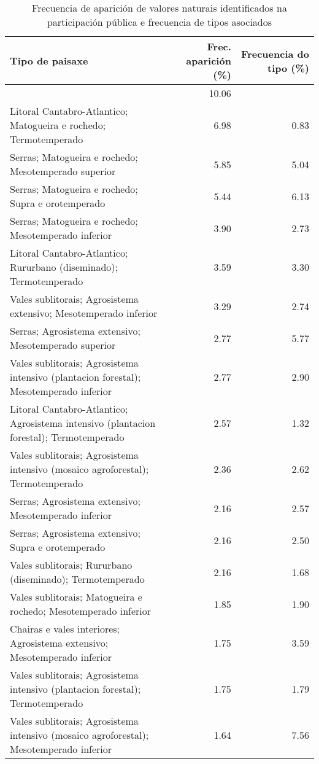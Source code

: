 \begin{table}[p]
\centering
\caption{Frecuencia de aparición de valores naturais identificados na participación pública e frecuencia de tipos asociados} 
\label{vsixotnat}
\begin{tabular}{lrr}
  \hline
Tipo de paisaxe & Frec. aparición (\%) & Frecuencia do tipo (\%) \\ 
  \hline
 & 10.06 &  \\ 
  Litoral Cantabro-Atlantico; Matogueira e rochedo; Termotemperado & 6.98 & 0.83 \\ 
  Serras; Matogueira e rochedo; Mesotemperado superior & 5.85 & 5.04 \\ 
  Serras; Matogueira e rochedo; Supra e orotemperado & 5.44 & 6.13 \\ 
  Serras; Matogueira e rochedo; Mesotemperado inferior & 3.90 & 2.73 \\ 
  Litoral Cantabro-Atlantico; Rururbano (diseminado); Termotemperado & 3.59 & 3.30 \\ 
  Vales sublitorais; Agrosistema extensivo; Mesotemperado inferior & 3.29 & 2.74 \\ 
  Serras; Agrosistema extensivo; Mesotemperado superior & 2.77 & 5.77 \\ 
  Vales sublitorais; Agrosistema intensivo (plantacion forestal); Mesotemperado inferior & 2.77 & 2.90 \\ 
  Litoral Cantabro-Atlantico; Agrosistema intensivo (plantacion forestal); Termotemperado & 2.57 & 1.32 \\ 
  Vales sublitorais; Agrosistema intensivo (mosaico agroforestal); Termotemperado & 2.36 & 2.62 \\ 
  Serras; Agrosistema extensivo; Mesotemperado inferior & 2.16 & 2.57 \\ 
  Serras; Agrosistema extensivo; Supra e orotemperado & 2.16 & 2.50 \\ 
  Vales sublitorais; Rururbano (diseminado); Termotemperado & 2.16 & 1.68 \\ 
  Vales sublitorais; Matogueira e rochedo; Mesotemperado inferior & 1.85 & 1.90 \\ 
  Chairas e vales interiores; Agrosistema extensivo; Mesotemperado inferior & 1.75 & 3.59 \\ 
  Vales sublitorais; Agrosistema intensivo (plantacion forestal); Termotemperado & 1.75 & 1.79 \\ 
  Vales sublitorais; Agrosistema intensivo (mosaico agroforestal); Mesotemperado inferior & 1.64 & 7.56 \\ 

\end{tabular}
\end{table}
